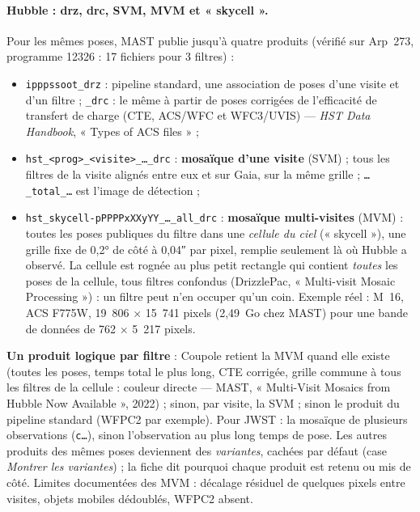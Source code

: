 \paragraph{Hubble : drz, drc, SVM, MVM et « skycell ».} Pour les mêmes poses, MAST publie jusqu'à quatre produits
(vérifié sur Arp~273, programme 12326 : 17 fichiers pour 3 filtres) :
\begin{itemize}
\item \texttt{ipppssoot\_drz} : pipeline standard, une association de poses d'une visite et d'un filtre ;
  \texttt{\_drc} : le même à partir de poses corrigées de l'efficacité de transfert de charge (CTE, ACS/WFC et
  WFC3/UVIS) — \emph{HST Data Handbook}, « Types of ACS files » ;
\item \texttt{hst\_<prog>\_<visite>\_…\_drc} : \textbf{mosaïque d'une visite} (SVM) ; tous les filtres de la visite
  alignés entre eux et sur Gaia, sur la même grille ; \texttt{…\_total\_…} est l'image de détection ;
\item \texttt{hst\_skycell-pPPPPxXXyYY\_…\_all\_drc} : \textbf{mosaïque multi-visites} (MVM) : toutes les poses
  publiques du filtre dans une \emph{cellule du ciel} (« skycell »), une grille fixe de 0,2° de côté à 0,04″ par
  pixel, remplie seulement là où Hubble a observé. La cellule est rognée au plus petit rectangle qui contient
  \emph{toutes} les poses de la cellule, tous filtres confondus (DrizzlePac, « Multi-visit Mosaic Processing ») : un
  filtre peut n'en occuper qu'un coin. Exemple réel : M~16, ACS F775W, 19~806 × 15~741 pixels (2,49~Go chez MAST)
  pour une bande de données de 762 × 5~217 pixels.
\end{itemize}
\textbf{Un produit logique par filtre} : Coupole retient la MVM quand elle existe (toutes les poses, temps total le
plus long, CTE corrigée, grille commune à tous les filtres de la cellule : couleur directe — MAST, « Multi-Visit
Mosaics from Hubble Now Available », 2022) ; sinon, par visite, la SVM ; sinon le produit du pipeline standard
(WFPC2 par exemple). Pour JWST : la mosaïque de plusieurs observations (\texttt{c…}), sinon l'observation au plus
long temps de pose. Les autres produits des mêmes poses deviennent des \emph{variantes}, cachées par défaut (case
\emph{Montrer les variantes}) ; la fiche dit pourquoi chaque produit est retenu ou mis de côté. Limites documentées
des MVM : décalage résiduel de quelques pixels entre visites, objets mobiles dédoublés, WFPC2 absent.

